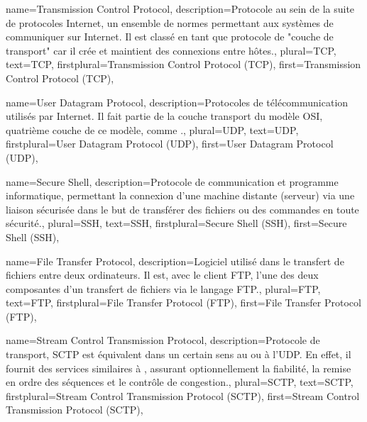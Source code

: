 {
    name={Transmission Control Protocol},
    description={Protocole au sein de la suite de protocoles Internet, un ensemble de normes
            permettant aux systèmes de communiquer sur Internet. Il est classé en tant que protocole de
            "couche de transport" car il crée et maintient des connexions entre hôtes.},
    plural={TCP},
    text={TCP},
    firstplural={Transmission Control Protocol (TCP)},
    first={Transmission Control Protocol (TCP)},
}

{
    name={User Datagram Protocol},
    description={Protocoles de télécommunication utilisés par Internet. Il fait partie de la couche
            transport du modèle OSI, quatrième couche de ce modèle, comme .},
    plural={UDP},
    text={UDP},
    firstplural={User Datagram Protocol (UDP)},
    first={User Datagram Protocol (UDP)},
}

{
    name={Secure Shell},
    description={Protocole de communication et programme informatique, permettant la connexion d'une
            machine distante (serveur) via une liaison sécurisée dans le but de transférer des fichiers
            ou des commandes en toute sécurité.},
    plural={SSH},
    text={SSH},
    firstplural={Secure Shell (SSH)},
    first={Secure Shell (SSH)},
}

{
    name={File Transfer Protocol},
    description={Logiciel utilisé dans le transfert de fichiers entre deux ordinateurs. Il est, avec le
            client FTP, l'une des deux composantes d'un transfert de fichiers via le langage FTP.},
    plural={FTP},
    text={FTP},
    firstplural={File Transfer Protocol (FTP)},
    first={File Transfer Protocol (FTP)},
}

{
    name={Stream Control Transmission Protocol},
    description={Protocole de transport, SCTP est équivalent dans un certain sens au  ou à
            l'\gls{UDP}. En effet, il fournit des services similaires à , assurant
            optionnellement la fiabilité, la remise en ordre des séquences et le contrôle de congestion.},
    plural={SCTP},
    text={SCTP},
    firstplural={Stream Control Transmission Protocol (SCTP)},
    first={Stream Control Transmission Protocol (SCTP)},
}


